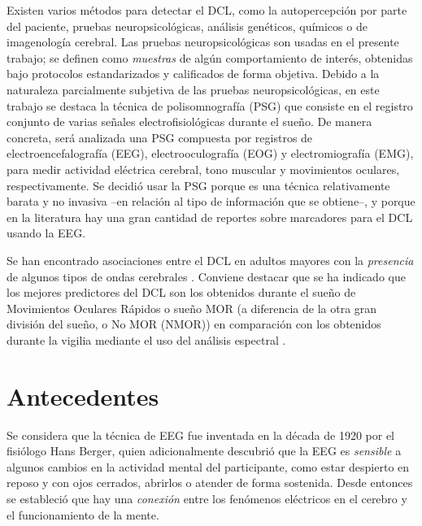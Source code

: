 \documentclass[12pt,letterpaper]{book}
\begin{document}
Existen varios métodos para detectar el DCL, como la autopercepción por parte del paciente, pruebas neuropsicológicas, análisis genéticos, químicos o de imagenología cerebral.
%
Las pruebas neuropsicológicas son usadas en el presente trabajo; se definen como \textit{muestras} de algún comportamiento de interés, obtenidas bajo protocolos estandarizados y calificados de forma objetiva.
%
Debido a la naturaleza parcialmente subjetiva de las pruebas neuropsicológicas, en este trabajo se destaca la técnica de polisomnografía (PSG) que consiste en el registro conjunto de varias señales electrofisiológicas durante el sueño.
%
De manera concreta, será analizada una PSG compuesta por registros de electroencefalografía (EEG), electrooculografía (EOG) y electromiografía (EMG), para medir actividad eléctrica cerebral, tono muscular y movimientos oculares, respectivamente.
%
Se decidió usar la PSG porque es una técnica relativamente barata y no invasiva --en relación al tipo de información que se obtiene--, y porque en la literatura hay una gran cantidad de reportes sobre marcadores para el DCL usando la EEG.

Se han encontrado asociaciones entre el DCL en adultos mayores con la \textit{presencia} de algunos tipos de ondas cerebrales \cite{babiloni13,prichep06,prichep94}.
%
Conviene destacar que se ha indicado que los mejores predictores del DCL son los obtenidos durante el sueño de Movimientos Oculares Rápidos o sueño MOR (a diferencia de la otra gran división del sueño, o No MOR (NMOR)) en comparación con los obtenidos durante la vigilia mediante el uso del análisis espectral \cite{Brayet16}.


\section*{Antecedentes}

Se considera que la técnica de EEG fue inventada en la década de 1920 por el fisiólogo Hans Berger, quien adicionalmente descubrió que la EEG es \textit{sensible} a algunos cambios en la actividad mental del participante, como estar despierto en reposo y con ojos cerrados, abrirlos o atender de forma sostenida.
%
Desde entonces se estableció que hay una \textit{conexión} entre los fenómenos eléctricos en el cerebro y el funcionamiento de la mente.
\end{document}
